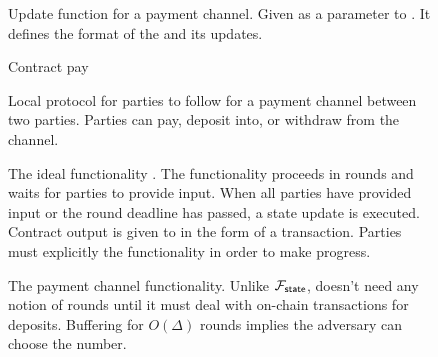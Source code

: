 \begin{figure}[h]
	
	\caption{Update function for a payment channel. Given as a parameter to \Fstate. It defines the format of the  and its updates.}
\end{figure}

\begin{figure}[h]
	
	\caption{Contract pay}
\end{figure}

\begin{figure}[h]
	
	\caption{Local protocol for parties to follow for a payment channel between two parties. Parties can pay, deposit into, or withdraw from the channel.}
\end{figure}

\begin{figure}[h]
	
	\caption{The ideal functionality \Fstate. The functionality proceeds in rounds and waits for parties to provide input. When all parties have provided input or the round deadline has passed, a state update is executed. Contract output is given to \Gledger in the form of a transaction. Parties must explicitly  the functionality in order to make progress. }
\end{figure}

\begin{figure}[h]
	
	\caption{The payment channel functionality. Unlike $\mathcal{F}_{{\mathsf {state}}}$, doesn't need any notion of rounds until it must deal with on-chain transactions for deposits. Buffering for $O(\Delta)$ rounds implies the adversary can choose the number.}
\end{figure}

